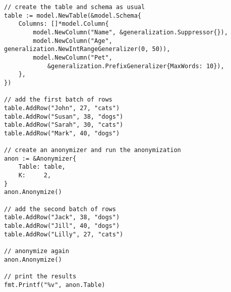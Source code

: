 \begin{lstlisting}[caption=Continuous anonymization,label=lst:continuous,float,floatplacement=H]
// create the table and schema as usual
table := model.NewTable(&model.Schema{
    Columns: []*model.Column{
        model.NewColumn("Name", &generalization.Suppressor{}),
        model.NewColumn("Age", generalization.NewIntRangeGeneralizer(0, 50)),
        model.NewColumn("Pet",
            &generalization.PrefixGeneralizer{MaxWords: 10}),
    },
})

// add the first batch of rows
table.AddRow("John", 27, "cats")
table.AddRow("Susan", 38, "dogs")
table.AddRow("Sarah", 30, "cats")
table.AddRow("Mark", 40, "dogs")

// create an anonymizer and run the anonymization
anon := &Anonymizer{
    Table: table,
    K:     2,
}
anon.Anonymize()

// add the second batch of rows
table.AddRow("Jack", 38, "dogs")
table.AddRow("Jill", 40, "dogs")
table.AddRow("Lilly", 27, "cats")

// anonymize again
anon.Anonymize()

// print the results
fmt.Printf("%v", anon.Table)
\end{lstlisting}